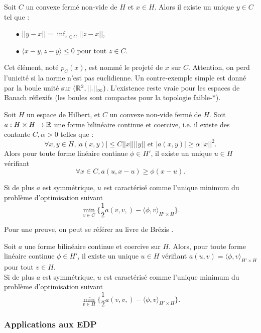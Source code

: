 \begin{thm}
Soit $C$ un convexe fermé non-vide de $H$ et $x\in H$. Alors il existe un unique $y\in C$ tel que :
\begin{itemize}
\item[$\bullet$] $||y-x|| = \inf_{z\in C}||z-x||$,
\item[$\bullet$] $\langle x-y,z-y \rangle \leq 0 $ pour tout $z\in C$.
\end{itemize}
\end{thm}

Cet élément, noté $p_C(x)$, est nommé le projeté de $x$ sur $C$. Attention, on perd l'unicité si la norme n'est pas euclidienne. Un contre-exemple simple est donné par la boule unité sur $(\mathbb R^2,||.||_\infty)$. L'existence reste vraie pour les espaces de Banach réflexifs (les boules sont compactes pour la topologie faible-$*$). 

\begin{thm}[Stampacchia]
Soit $H$ un espace de Hilbert, et $C$ un convexe non-vide fermé de $H$. Soit $a : H\times H \rightarrow \mathbb R$ une forme bilinéaire continue et coercive, i.e. il existe des contante $C,\alpha >0$ telles que :
\[\forall x,y\in H, |a(x,y)|\leq C ||x|| ||y|| \text{ et } |a(x,y)|\geq \alpha ||x||^2.\]
Alors pour toute forme linéaire continue $\phi\in H'$, il existe un unique $u\in H$ vérifiant 
\[\forall x\in C, a(u,x-u)\geq \phi(x-u). \]

Si de plus $a$ est symmétrique, $u$ est caractérisé comme l'unique minimum du problème d'optimisation suivant
\[\min_{v\in C} \{\frac{1}{2} a(v,v,)-\langle \phi,v\rangle_{H'\times H}\}.\]
\end{thm}

Pour une preuve, on peut se référer au livre de Brézis \cite{brezis} \cite{brezis2010}.

\begin{cor}
Soit $a$ une forme bilinéaire continue et coercive sur $H$. Alors, pour toute forme linéaire continue $\phi\in H'$, il existe un unique $u\in H$ vérifiant $a(u,v)= \langle \phi, v\rangle_{H'\times H}$ pour tout $v\in H$.\\

Si de plus $a$ est symmétrique, $u$ est caractérisé comme l'unique minimum du problème d'optimisation suivant
\[\min_{v\in H} \{\frac{1}{2} a(v,v,)-\langle \phi,v\rangle_{H'\times H}\}.\]
\end{cor}

\subsubsection{Applications aux EDP}

